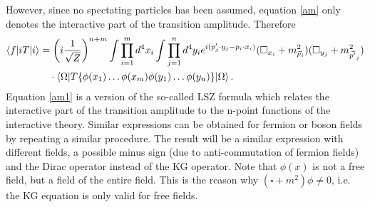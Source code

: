 However, since no spectating particles has been assumed, equation \eqref{am} only denotes the interactive part of the transition amplitude. Therefore
\begin{equation}
	\begin{split}
		\braket{f|iT|i}&=\bigg(i\frac{1}{\sqrt{Z}}\bigg)^{n+m}\int\prod_{i=1}^m d^4x_i\int\prod_{j=1}^n d^4y_ie^{i(p'_j\cdot y_j-p_i\cdot x_i)}(\square _{x_i}+m_{\vec{p}_i}^2)(\square _{y_j}+m_{\vec{p'}_j}^2)\\
		&\quad\cdot\braket{\Omega|T\{\phi(x_1)\dots\phi(x_m)\phi(y_1)\dots \phi(y_n)\}|\Omega}.\\
	\end{split}
	\label{am1}
\end{equation} 
Equation \eqref{am1} is a version of the so-called LSZ formula which relates the interactive part of the transition amplitude to the n-point functions of the interactive theory. Similar expressions can be obtained for fermion or boson fields by repeating a similar procedure. The result will be a similar expression with different fields, a possible minus sign (due to anti-commutation of fermion fields) and the Dirac operator instead of the KG operator. Note that $\phi(x)$ is not a free field, but a field of the entire field. This is the reason why $(\square +m^2)\phi\neq0$, i.e. the KG equation is only valid for free fields. 

